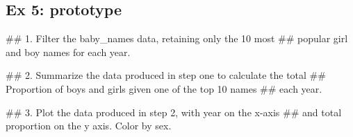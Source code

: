 \documentclass[]{book}
\newenvironment{Shaded}{\begin{snugshade}}{\end{snugshade}}
\newcommand{\KeywordTok}[1]{\textcolor[rgb]{0.13,0.29,0.53}{\textbf{#1}}}
\newcommand{\DataTypeTok}[1]{\textcolor[rgb]{0.13,0.29,0.53}{#1}}
\newcommand{\DecValTok}[1]{\textcolor[rgb]{0.00,0.00,0.81}{#1}}
\newcommand{\StringTok}[1]{\textcolor[rgb]{0.31,0.60,0.02}{#1}}
\newcommand{\CommentTok}[1]{\textcolor[rgb]{0.56,0.35,0.01}{\textit{#1}}}
\newcommand{\OperatorTok}[1]{\textcolor[rgb]{0.81,0.36,0.00}{\textbf{#1}}}
\newcommand{\NormalTok}[1]{#1}
\begin{document}
\subsection{Ex 5: prototype}\label{ex-5-prototype}

\begin{Shaded}
\begin{Highlighting}[]
\NormalTok{## 1.  Filter the baby_names data, retaining only the 10 most }
\NormalTok{##     popular girl and boy names for each year.}
\end{Highlighting}
\end{Shaded}

\begin{Shaded}
\end{Shaded}

\begin{Shaded}
\begin{Highlighting}[]
\NormalTok{## 2.  Summarize the data produced in step one to calculate the total}
\NormalTok{##     Proportion of boys and girls given one of the top 10 names}
\NormalTok{##     each year.}
\end{Highlighting}
\end{Shaded}

\begin{Shaded}
\end{Shaded}

\begin{Shaded}
\begin{Highlighting}[]
\NormalTok{## 3.  Plot the data produced in step 2, with year on the x-axis}
\NormalTok{##     and total proportion on the y axis. Color by sex.}
\end{Highlighting}
\end{Shaded}
\end{document}
